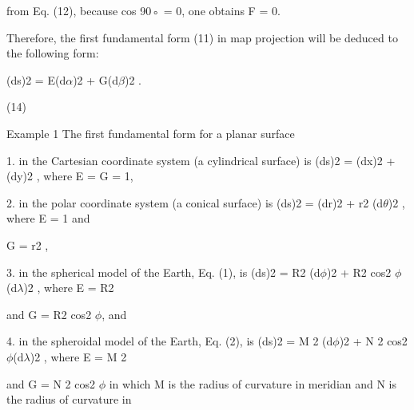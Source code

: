 \documentclass[a4paper,portrait,12pt]{article}
\begin{document}
\begin{flushleft}
from Eq. (12), because cos 90◦ = 0, one obtains F = 0.
\end{flushleft}


\begin{flushleft}
Therefore, the first fundamental form (11) in map projection will be deduced to the following form:
\end{flushleft}


\begin{flushleft}
(ds)2 = E(d$\alpha$)2 + G(d$\beta$)2 .
\end{flushleft}





(14)





\begin{flushleft}
Example 1 The first fundamental form for a planar surface
\end{flushleft}


\begin{flushleft}
1. in the Cartesian coordinate system (a cylindrical surface) is (ds)2 = (dx)2 +(dy)2 , where E = G = 1,
\end{flushleft}


\begin{flushleft}
2. in the polar coordinate system (a conical surface) is (ds)2 = (dr)2 + r2 (d$\theta$)2 , where E = 1 and
\end{flushleft}


\begin{flushleft}
G = r2 ,
\end{flushleft}


\begin{flushleft}
3. in the spherical model of the Earth, Eq. (1), is (ds)2 = R2 (d$\phi$)2 + R2 cos2 $\phi$(d$\lambda$)2 , where E = R2
\end{flushleft}


\begin{flushleft}
and G = R2 cos2 $\phi$, and
\end{flushleft}


\begin{flushleft}
4. in the spheroidal model of the Earth, Eq. (2), is (ds)2 = M 2 (d$\phi$)2 + N 2 cos2 $\phi$(d$\lambda$)2 , where E = M 2
\end{flushleft}


\begin{flushleft}
and G = N 2 cos2 $\phi$ in which M is the radius of curvature in meridian and N is the radius of curvature in
\end{flushleft}
\end{document}
